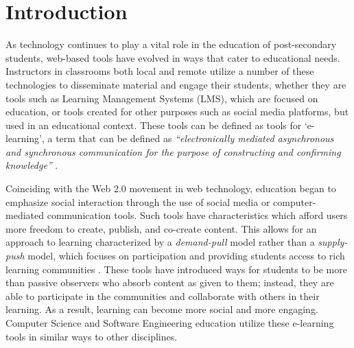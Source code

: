 \chapter{Introduction}



As technology continues to play a vital role in the education of post-secondary students, web-based tools have evolved in ways that cater to educational needs. Instructors in classrooms both local and remote utilize a number of these technologies to disseminate material and engage their students, whether they are tools such as Learning Management Systems (LMS), which are focused on education, or tools created for other purposes such as social media platforms, but used in an educational context. These tools can be defined as tools for `e-learning', a term that can be defined as \textit{``electronically mediated asynchronous and synchronous communication for the purpose of constructing and confirming knowledge''} \cite{garrison2011learning}.

Coinciding with the Web 2.0 movement \cite{O'Reilly-What-2005} in web technology, education began to emphasize social interaction through the use of social media or computer-mediated communication tools. Such tools have characteristics which afford users more freedom to create, publish, and co-create content. This allows for an approach to learning characterized by a \emph{demand-pull} model rather than a \emph{supply-push} model, which focuses on participation and providing students access to rich learning communities \cite{seely2008open}. These tools have introduced ways for students to be more than passive observers who absorb content as given to them; instead, they are able to participate in the communities and collaborate with others in their learning. As a result, learning can become more social and more engaging. Computer Science and Software Engineering education utilize these e-learning tools in similar ways to other disciplines.


